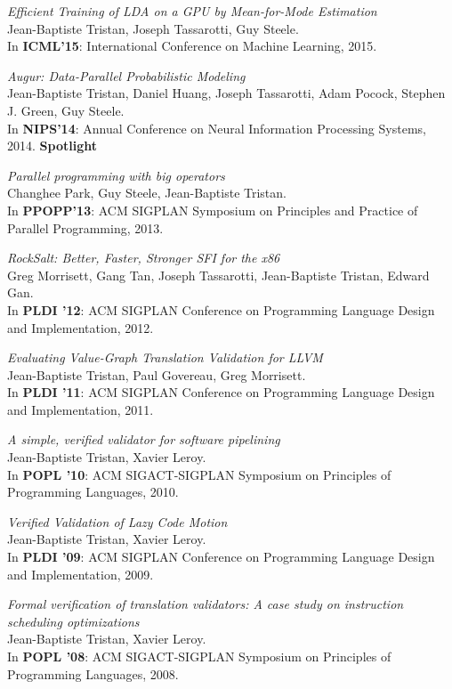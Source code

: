 \documentclass[margin,line]{res}
\begin{document}
\begin{resume}
\emph{Efficient Training of LDA on a GPU by Mean-for-Mode Estimation}\\
Jean-Baptiste Tristan, Joseph Tassarotti, Guy Steele.\\
In {\bf ICML'15}: International Conference on Machine Learning, 2015. 

\emph{Augur: Data-Parallel Probabilistic Modeling}\\
Jean-Baptiste Tristan, Daniel Huang, Joseph Tassarotti, Adam Pocock, Stephen J. Green, Guy Steele.\\
In {\bf NIPS'14}: Annual Conference on Neural Information Processing Systems, 2014. {\bf Spotlight}

\emph{Parallel programming with big operators}\\
Changhee Park, Guy Steele, Jean-Baptiste Tristan.\\
In {\bf PPOPP'13}: ACM SIGPLAN Symposium on
Principles and Practice of Parallel Programming, 2013. 

\emph{RockSalt: Better, Faster, Stronger SFI for the x86}\\
Greg Morrisett, Gang Tan, Joseph Tassarotti, Jean-Baptiste Tristan, Edward Gan.\\
In {\bf PLDI '12}: ACM SIGPLAN Conference on Programming
Language Design and Implementation, 2012. 

\emph{Evaluating Value-Graph Translation Validation for LLVM}\\
Jean-Baptiste Tristan, Paul Govereau, Greg Morrisett.\\
In {\bf PLDI '11}: ACM SIGPLAN Conference on Programming
Language Design and Implementation, 2011. 

\emph{A simple, verified validator for software pipelining}\\
Jean-Baptiste Tristan, Xavier Leroy.\\
In {\bf POPL '10}: ACM SIGACT-SIGPLAN Symposium on
Principles of Programming Languages, 2010.

\emph{Verified Validation of Lazy Code Motion}\\
Jean-Baptiste Tristan, Xavier Leroy.\\
In {\bf PLDI '09}: ACM SIGPLAN Conference on Programming
Language Design and Implementation, 2009. 

\emph{Formal verification of translation validators: A case study on instruction scheduling optimizations}\\
Jean-Baptiste Tristan, Xavier Leroy.\\
In {\bf POPL '08}: ACM SIGACT-SIGPLAN Symposium on
Principles of Programming Languages, 2008.


\end{resume}
\end{document}
